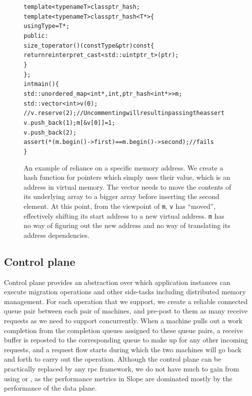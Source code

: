 \begin{figure}
\begin{alltt}

template<typename T> class ptr_hash;
template<typename T> class ptr_hash<T*> \{
  using Type = T*;
 public:
  size_t operator()(const Type& ptr) const \{
    return reinterpret_cast<std::uintptr_t>(ptr);
  \}
\};
int main() \{
  std::unordered_map<int*, int, ptr_hash<int*>> m;
  std::vector<int> v(0);
  // v.reserve(2); // Uncommenting will result in passing the assert
  v.push_back(1); m[&v[0]] = 1;
  v.push_back(2);
  assert(*(m.begin()->first) == m.begin()->second); // fails
\}

\end{alltt}
\caption{
    An example of reliance on a specific memory address. We create a hash
    function for pointers which simply uses their value, which is an address
    in virtual memory. The vector needs to move the contents of its underlying array to a
    bigger array before inserting the second element. At this point, from the viewpoint of
    \texttt{m}, \texttt{v} has ``moved'', effectively shifting its start
    address to a new virtual address. \texttt{m} has no way of figuring out
    the new address and no way of translating its address dependencies.
}
\label{fig:localmemorymanagementfundamental}
\end{figure}


\subsection{Control plane}
Control plane provides an abstraction over which application instances can
execute migration operations and other side-tasks including distributed
memory management. For each operation that we support, we create a reliable
connected queue pair between each pair of machines, and pre-post to them
as many receive requests as we need to support concurrently. When a
machine pulls out a work completion from the completion queues assigned to
these queue pairs, a receive buffer is reposted to the corresponding queue to
make up for any other incoming requests, and a request flow starts during which
the two machines will go back and forth to carry out the operation. Although
the control plane can be practically replaced by any rpc framework, we do not
have much to gain from using \cite{kalia2016designguidelines} or
\cite{kalia2016fasst}, as the performance metrics in Slope are dominated mostly
by the performance of the data plane.


